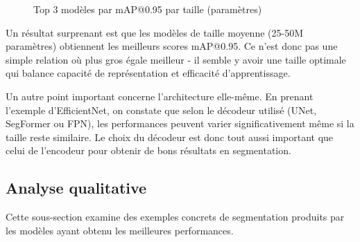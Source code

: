\begin{figure}[H]
    \centering
    \caption{Top 3 modèles par mAP@0.95 par taille (paramètres)}
    \label{fig:ch4_05_models_by_size_category_04_eval_test_map_95_mean}
\end{figure}

Un résultat surprenant est que les modèles de taille moyenne (25-50M paramètres) obtiennent les meilleurs scores mAP@0.95. Ce n'est donc pas une simple relation où plus gros égale meilleur - il semble y avoir une taille optimale qui balance capacité de représentation et efficacité d'apprentissage.

Un autre point important concerne l'architecture elle-même. En prenant l'exemple d'EfficientNet, on constate que selon le décodeur utilisé (UNet, SegFormer ou FPN), les performances peuvent varier significativement même si la taille reste similaire. Le choix du décodeur est donc tout aussi important que celui de l'encodeur pour obtenir de bons résultats en segmentation.

\subsection{Analyse qualitative}
Cette sous-section examine des exemples concrets de segmentation produits par les modèles ayant obtenu les meilleures performances.

